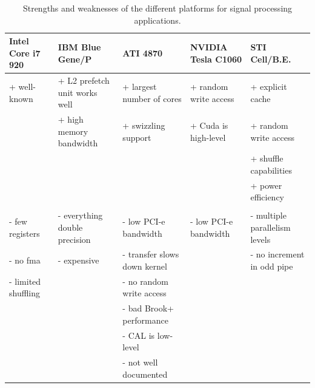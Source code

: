 \documentclass{article}
\begin{document}
\begin{table}[t]
\begin{center}
{\small
\begin{tabular}{l|l|l|l|l}
Intel Core i7 920            & IBM Blue Gene/P                  & ATI 4870                     & NVIDIA Tesla C1060           & STI  Cell/B.E.                \\
\hline
+ well-known                 & + L2 prefetch unit works well    & + largest number of cores    & + random write access        & + explicit cache              \\
                             & + high memory bandwidth          & + swizzling support          & + Cuda is high-level         & + random write access         \\
                             &                                  &                              &                              & + shuffle capabilities        \\
                             &                                  &                              &                              & + power efficiency            \\
                             &                                  &                              &                              &                               \\
- few registers              & - everything double precision    & - low PCI-e bandwidth        & - low PCI-e bandwidth        & - multiple parallelism levels \\
- no fma                     & - expensive                      & - transfer slows down kernel &                              & - no increment in odd pipe    \\
- limited shuffling          &                                  & - no random write access     &                              &                               \\
                             &                                  & - bad Brook+ performance     &                              &                               \\
                             &                                  & - CAL is low-level           &                              &                               \\
                             &                                  & - not well documented        &                              &                               \\
\end{tabular}
} %
\end{center}
\vspace{-0.5cm}
\caption{Strengths and weaknesses of the different platforms for signal processing applications.}
\label{architecture-results-table}
\end{table}
\end{document}
